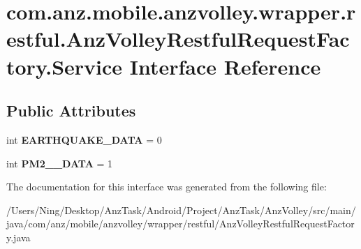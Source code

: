 \hypertarget{interfacecom_1_1anz_1_1mobile_1_1anzvolley_1_1wrapper_1_1restful_1_1_anz_volley_restful_request_factory_1_1_service}{\section{com.\+anz.\+mobile.\+anzvolley.\+wrapper.\+restful.\+Anz\+Volley\+Restful\+Request\+Factory.\+Service Interface Reference}
\label{interfacecom_1_1anz_1_1mobile_1_1anzvolley_1_1wrapper_1_1restful_1_1_anz_volley_restful_request_factory_1_1_service}
}
\subsection*{Public Attributes}
\begin{DoxyCompactItemize}
\item 
\hypertarget{interfacecom_1_1anz_1_1mobile_1_1anzvolley_1_1wrapper_1_1restful_1_1_anz_volley_restful_request_factory_1_1_service_ad9f177a2a4f8c7e9fa650c336d5a4031}{int {\bfseries E\+A\+R\+T\+H\+Q\+U\+A\+K\+E\+\_\+\+D\+A\+T\+A} = 0}\label{interfacecom_1_1anz_1_1mobile_1_1anzvolley_1_1wrapper_1_1restful_1_1_anz_volley_restful_request_factory_1_1_service_ad9f177a2a4f8c7e9fa650c336d5a4031}

\item 
\hypertarget{interfacecom_1_1anz_1_1mobile_1_1anzvolley_1_1wrapper_1_1restful_1_1_anz_volley_restful_request_factory_1_1_service_a2ba95a8f05ef11a8e62b6afc22000b47}{int {\bfseries P\+M2\+\_\+\_\+\+D\+A\+T\+A} = 1}\label{interfacecom_1_1anz_1_1mobile_1_1anzvolley_1_1wrapper_1_1restful_1_1_anz_volley_restful_request_factory_1_1_service_a2ba95a8f05ef11a8e62b6afc22000b47}

\end{DoxyCompactItemize}


The documentation for this interface was generated from the following file\+:\begin{DoxyCompactItemize}
\item 
/\+Users/\+Ning/\+Desktop/\+Anz\+Task/\+Android/\+Project/\+Anz\+Task/\+Anz\+Volley/src/main/java/com/anz/mobile/anzvolley/wrapper/restful/Anz\+Volley\+Restful\+Request\+Factory.\+java\end{DoxyCompactItemize}
